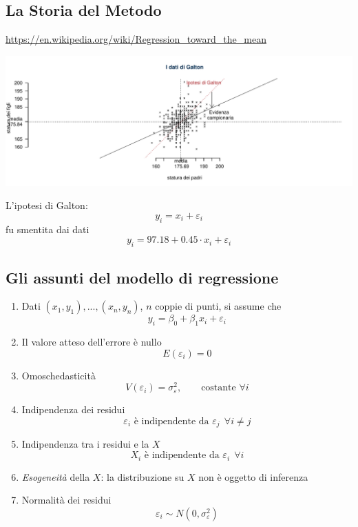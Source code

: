 \documentclass[
  11pt,
]{book}
\providecommand{\tightlist}{%
  \setlength{\itemsep}{0pt}\setlength{\parskip}{0pt}}
\theoremstyle{mytheoremstyle}
\theoremstyle{mydefstyle}
\begin{document}
\subsection{La Storia del Metodo}\label{la-storia-del-metodo}

\url{https://en.wikipedia.org/wiki/Regression_toward_the_mean}

\begin{center}\includegraphics{Appunti_di_Statistica_2025_files/figure-latex/17-regressione-I-18-1} \end{center}

L'ipotesi di Galton:
\[
y_i = x_i +\varepsilon_i
\]
fu smentita dai dati
\[
y_i = 97.18+0.45\cdot x_i +\varepsilon_i
\]

\subsection{Gli assunti del modello di regressione}\label{gli-assunti-del-modello-di-regressione}

\begin{info}

\begin{enumerate}
\def\labelenumi{\arabic{enumi}.}
\setcounter{enumi}{-1}
\tightlist
\item
  Dati \((x_1,y_1),...,(x_n,y_n)\), \(n\) coppie di punti, si assume che
  \[y_i=\beta_0+\beta_1x_i+\varepsilon_i\]
\item
  Il valore atteso dell'errore è nullo
  \[E(\varepsilon_i)=0\]
\item
  Omoschedasticità
  \[V(\varepsilon_{i}) = \sigma_\varepsilon^2,\qquad \text{costante }\forall i\]
\item
  Indipendenza dei residui
  \[\varepsilon_i\text{ è indipendente da }\varepsilon_j~~\forall i\neq j\]
\item
  Indipendenza tra i residui e la \(X\)
  \[X_i\text{ è indipendente da }\varepsilon_i~~\forall i\]
\item
  \emph{Esogeneità} della \(X\): la distribuzione su \(X\) non è oggetto di inferenza
\item
  Normalità dei residui
  \[\varepsilon_i\sim N(0,\sigma^2_\varepsilon)\]
\end{enumerate}

\end{info}
\end{document}

